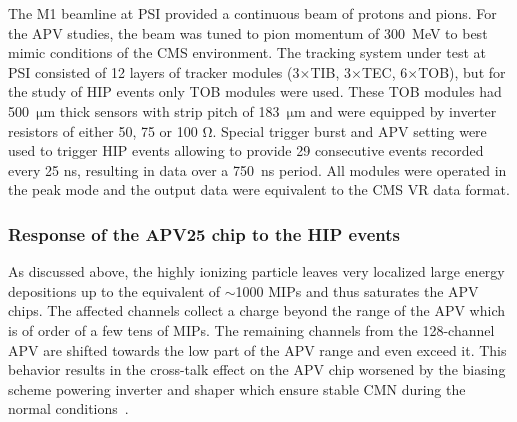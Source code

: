 The M1 beamline at PSI provided a continuous beam of protons and pions. For the APV studies, the beam was tuned to pion momentum of 300~MeV to best mimic conditions of the CMS environment. The tracking system under test at PSI consisted of 12 layers of tracker modules (3$\times$TIB, 3$\times$TEC, 6$\times$TOB), but for the study of HIP events only TOB modules were used. These TOB modules had 500~$\mathrm{\mu m}$ thick sensors with strip pitch of 183~$\mathrm{\mu}$m and were equipped by inverter resistors of either 50, 75 or 100 $\mathrm{\Omega}$. Special trigger burst and APV setting were used to trigger HIP events allowing to provide 29 consecutive events recorded every 25 ns, resulting in data over a 750~ns period. All modules were operated in the peak mode and the output data were equivalent to the CMS VR data format. 




\subsubsection{Response of the APV25 chip to the HIP events}

As discussed above, the highly ionizing particle leaves very localized large energy depositions up to the equivalent of $\sim$1000 MIPs and thus saturates the APV chips. The affected channels collect a charge beyond the range of the APV which is of order of a few tens of MIPs. The remaining channels from the 128-channel APV are shifted towards the low part of the APV range and even exceed it. This behavior results in the cross-talk effect on the APV chip worsened by the biasing scheme powering inverter and shaper which ensure stable CMN during the normal conditions~\cite{Bainbridge:2004jc}. 

